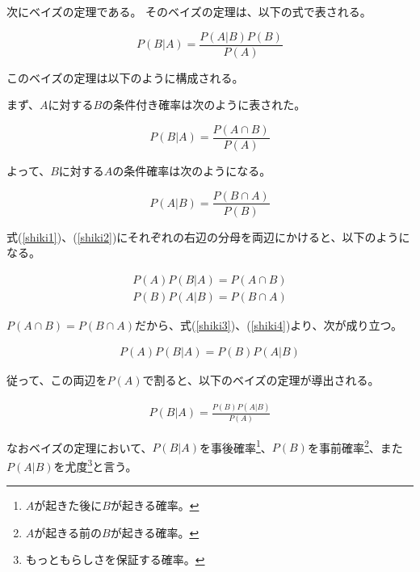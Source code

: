 \documentclass[11pt,a4j]{jsarticle}
\begin{document}
次にベイズの定理である。
そのベイズの定理は、以下の式で表される。

\[
P(B|A)=\frac{P(A|B)P(B)}{P(A)}
\]

\begin{comment}
このとき、事象$B$が発生する確率である$P(B)$は事前確率と呼ばれる。
$P(B|A)$は事象$A$が発生したあとに事象$B$が発生する条件付き確率を表す。これを$B$の事後確率と呼ぶ。
また、$P(A|B)$は事象$B$が発生したあとの事象$A$が発生する条件付き確率を表す。これを尤度と呼ぶ。
これは$B$が真の際にデータが得られる尤度を表し、尤度関数と呼ばれる。
この式から、事後確率$P(B|A)$は事前確率$P(B)$と尤度$P(A|B)$の積に比例することが分かる。
\end{comment}

このベイズの定理は以下のように構成される。

まず、$A$に対する$B$の条件付き確率は次のように表された。

\begin{equation}
P(B|A)=\frac{P(A \cap B)}{P(A)}
\label{shiki1}
\end{equation}

よって、$B$に対する$A$の条件確率は次のようになる。

\begin{equation}
P(A|B)=\frac{P(B \cap A)}{P(B)}
\label{shiki2}
\end{equation}

式(\ref{shiki1})、(\ref{shiki2})にそれぞれの右辺の分母を両辺にかけると、以下のようになる。

\begin{eqnarray}
  P(A)P(B|A)=P(A \cap B) \label{shiki3}\\
  P(B)P(A|B)=P(B \cap A) \label{shiki4}
\end{eqnarray}


$P(A \cap B)=P(B \cap A)$だから、式(\ref{shiki3})、(\ref{shiki4})より、次が成り立つ。

\begin{eqnarray}
  P(A)P(B|A)=P(B)P(A|B)
\end{eqnarray}

従って、この両辺を$P(A)$で割ると、以下のベイズの定理が導出される。

\begin{eqnarray}
  P(B|A)=\frac{P(B)P(A|B)}{P(A)}
\end{eqnarray}

なおベイズの定理において、$P(B|A)$を事後確率\footnote{$A$が起きた後に$B$が起きる確率。}、$P(B)$を事前確率\footnote{$A$が起きる前の$B$が起きる確率。}、また$P(A|B)$を尤度\footnote{もっともらしさを保証する確率。}と言う。
\end{document}
